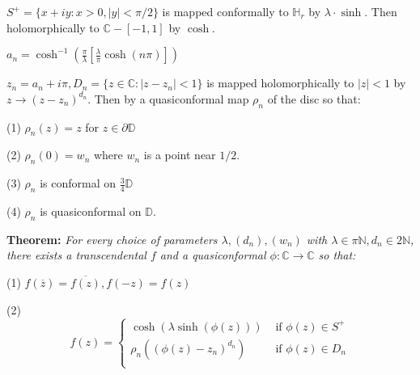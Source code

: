 \documentclass{beamer}
\begin{document}
\begin{frame} 

{\tiny $S^+ = \{ x + iy : x > 0, |y| < \pi/2 \}$ is mapped conformally to $\mathbb{H}_r$ by $\lambda\cdot\sinh$. Then holomorphically to $\mathbb{C} - [-1,1]$ by $\cosh$.

\vspace{1.25mm}

$a_n = \cosh^{-1}\left( \frac{\pi}{\lambda} \left[ \frac{\lambda}{\pi} \cosh(n\pi) \right] \right)$

\vspace{1.25mm}

$z_n = a_n + i\pi, D_n = \{ z \in \mathbb{C} : \left| z - z_n \right| < 1\} $ is mapped holomorphically to $|z|<1$ by $z\rightarrow (z - z_n)^{d_n}$. Then by a quasiconformal map $\rho_n$ of the disc so that: 

\hspace{5mm} (1) $\rho_n(z)=z$ for $z\in\partial\mathbb{D}$

\hspace{5mm} (2) $\rho_n(0)=w_n$ where $w_n$ is a point near $1/2$.

\hspace{5mm} (3) $\rho_n$ is conformal on $\frac{3}{4}\mathbb{D}$

\hspace{5mm} (4) $\rho_n$ is quasiconformal on $\mathbb{D}$.  

}

\vspace{5mm}

{\bf Theorem:}  {\it For every choice of parameters $\lambda, (d_n), (w_n)$ with $\lambda \in \pi\mathbb{N}, d_n \in 2\mathbb{N}$, there exists a transcendental $f$ and a quasiconformal $\phi: \mathbb{C}\rightarrow\mathbb{C}$ so that:}

\hspace{5mm} (1) $f(\overline{z}) = \overline{f(z)}, f(-z)=f(z)$

\hspace{5mm} (2) \[ f(z) = \begin{cases} 
      \cosh(\lambda\sinh(\phi(z))) & \textrm{ if } \phi(z)\in S^+ \\
      \rho_n((\phi(z)-z_n)^{d_n}) & \textrm{ if } \phi(z)\in D_n \\
   \end{cases} \]

\end{frame}
\end{document}
